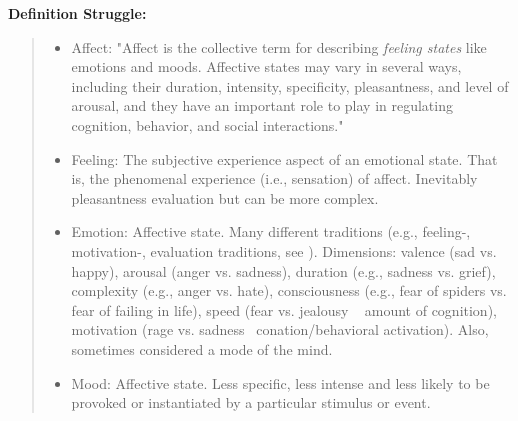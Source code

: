 \documentclass[nobib]{tufte-handout}
\begin{document}
\begin{framed}
    \textbf{Definition Struggle:}\\ 
    \begin{quote}
        \begin{itemize}
            \item Affect: "Affect is the collective term for describing \textit{feeling states} like emotions and moods. Affective states may vary in several ways, including their duration, intensity, specificity, pleasantness, and level of arousal, and they have an important role to play in regulating cognition, behavior, and social interactions." \citep[][p. 49]{Niven2013}
            \item Feeling: The subjective experience aspect of an emotional state. That is, the phenomenal experience (i.e., sensation) of affect. Inevitably pleasantness evaluation but can be more complex.
            \item Emotion: Affective state. Many different traditions (e.g., feeling-, motivation-, evaluation traditions, see \citealp{Scarantino2016}). Dimensions: valence (sad vs. happy), arousal (anger vs. sadness), duration (e.g., sadness vs. grief), complexity (e.g., anger vs. hate), consciousness (e.g., fear of spiders vs. fear of failing in life), speed (fear vs. jealousy ~ amount of cognition), motivation (rage vs. sadness ~conation/behavioral activation). Also, sometimes considered a mode of the mind.
            \item Mood: Affective state. Less specific, less intense and less likely to be provoked or instantiated by a particular stimulus or event.
        \end{itemize}
    \end{quote}
\end{framed}
\end{document}

